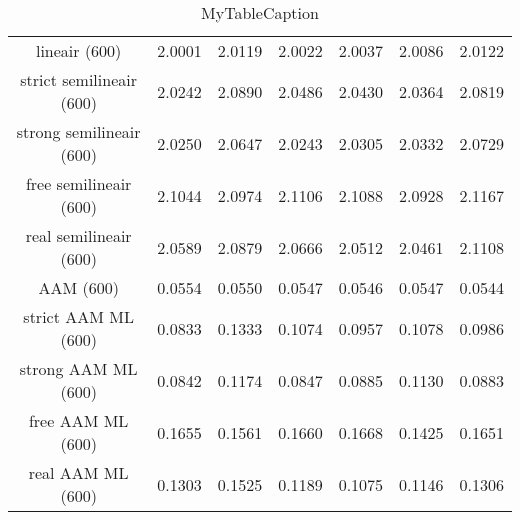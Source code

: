 \begin{table}
\centering
\begin{tabular}{|c|c|c|c|c|c|c|}
\hline
 &  &  &  &  &  &  \\
\hline
lineair (600) & 2.0001 & 2.0119 & 2.0022 & 2.0037 & 2.0086 & 2.0122 \\
\hline
strict semilineair (600) & 2.0242 & 2.0890 & 2.0486 & 2.0430 & 2.0364 & 2.0819 \\
\hline
strong semilineair (600) & 2.0250 & 2.0647 & 2.0243 & 2.0305 & 2.0332 & 2.0729 \\
\hline
free semilineair (600) & 2.1044 & 2.0974 & 2.1106 & 2.1088 & 2.0928 & 2.1167 \\
\hline
real semilineair (600) & 2.0589 & 2.0879 & 2.0666 & 2.0512 & 2.0461 & 2.1108 \\
\hline
AAM (600) & 0.0554 & 0.0550 & 0.0547 & 0.0546 & 0.0547 & 0.0544 \\
\hline
strict AAM ML (600) & 0.0833 & 0.1333 & 0.1074 & 0.0957 & 0.1078 & 0.0986 \\
\hline
strong AAM ML (600) & 0.0842 & 0.1174 & 0.0847 & 0.0885 & 0.1130 & 0.0883 \\
\hline
free AAM ML (600) & 0.1655 & 0.1561 & 0.1660 & 0.1668 & 0.1425 & 0.1651 \\
\hline
real AAM ML (600) & 0.1303 & 0.1525 & 0.1189 & 0.1075 & 0.1146 & 0.1306 \\
\hline
\end{tabular}
\caption{MyTableCaption}
\label{table:MyTableLabel}
\end{table}
